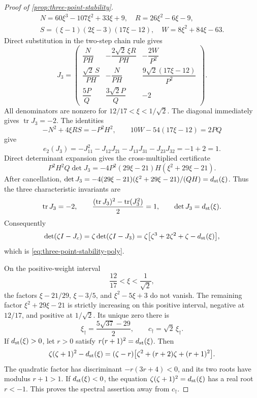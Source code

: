 \documentclass[letterpaper,twoside]{article}
\begin{document}
\begin{proof}[Proof of \cref{prop:three-point-stability}]
\[\begin{gathered}
 N=60\xi^3-107\xi^2+33\xi+9,\quad
 R=26\xi^2-6\xi-9,\\
 S=(\xi-1)(2\xi-3)(17\xi-12),\quad
 W=8\xi^2+84\xi-63.
\end{gathered}
\]
Direct substitution in the two-step chain rule gives
\begin{equation}\label{eq:three-point-J3-explicit}
 J_3=
 \begin{pmatrix}
 \dfrac{N}{PH} &-\dfrac{2\sqrt2\,\xi R}{PH}&-\dfrac{2W}{P^2}\\[2mm]
 \dfrac{\sqrt2\,S}{PH}&-\dfrac{N}{PH}&
       \dfrac{9\sqrt2(17\xi-12)}{P^2}\\[2mm]
 \dfrac{5P}{Q}&\dfrac{3\sqrt2P}{Q}&-2
 \end{pmatrix}.
\end{equation}
All denominators are nonzero for $12/17<\xi<1/\sqrt2$.  The diagonal
immediately gives $\operatorname{tr}J_3=-2$.  The identities
\begin{equation}\label{eq:three-point-e2-certificate}
 -N^2+4\xi RS=-P^2H^2,
 \qquad
 10W-54(17\xi-12)=2PQ
\end{equation}
give
\[
 e_2(J_3)
 =-J_{11}^2-J_{12}J_{21}-J_{13}J_{31}-J_{23}J_{32}
 =-1+2=1.
\]
Direct determinant
expansion gives the cross-multiplied certificate
\begin{equation}\label{eq:three-point-det-certificate}
 P^2H^2Q\det J_3
 =-4P^2(29\xi-21)H(\xi^2+29\xi-21).
\end{equation}
After cancellation,
$\det J_3=-4(29\xi-21)(\xi^2+29\xi-21)/(QH)=d_{\rm st}(\xi)$.
Thus the three characteristic invariants are
\begin{equation}\label{eq:stability-invariants}
 \operatorname{tr}J_3=-2,\qquad
 \frac{(\operatorname{tr}J_3)^2-\operatorname{tr}(J_3^2)}2=1,
 \qquad \det J_3=d_{\rm st}(\xi).
\end{equation}
Consequently
\[
 \det(\zeta I-J_c)
 =\zeta\det(\zeta I-J_3)
 =\zeta\bigl[\zeta^3+2\zeta^2+\zeta-d_{\rm st}(\xi)\bigr],
\]
which is \eqref{eq:three-point-stability-poly}.

On the positive-weight interval
\[
 \frac{12}{17}<\xi<\frac1{\sqrt2},
\]
the factors $\xi-21/29$, $\xi-3/5$, and
$\xi^2-5\xi+3$ do not vanish.  The remaining factor
$\xi^2+29\xi-21$ is strictly increasing on this positive interval, negative
at $12/17$, and positive at $1/\sqrt2$.  Its unique zero there is
\[
 \xi_\dagger=\frac{5\sqrt{37}-29}{2},
 \qquad c_\dagger=\sqrt2\,\xi_\dagger.
\]
If $d_{\rm st}(\xi)>0$, let $r>0$ satisfy
$r(r+1)^2=d_{\rm st}(\xi)$.  Then
\[
 \zeta(\zeta+1)^2-d_{\rm st}(\xi)
 =(\zeta-r)\bigl[\zeta^2+(r+2)\zeta+(r+1)^2\bigr].
\]
The quadratic factor has discriminant $-r(3r+4)<0$, and its two roots have
modulus $r+1>1$.  If $d_{\rm st}(\xi)<0$, the equation
$\zeta(\zeta+1)^2=d_{\rm st}(\xi)$ has a real root $r<-1$.
This proves the spectral assertion away from $c_\dagger$.


\end{proof}
\end{document}
